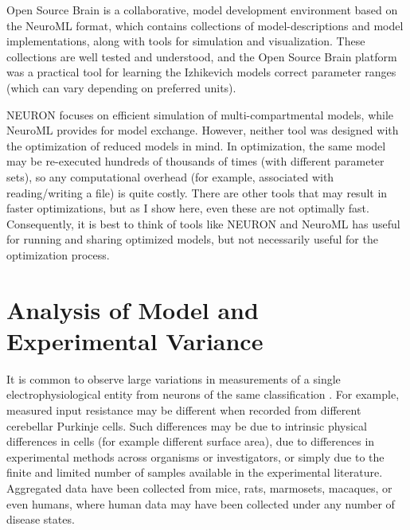 
Open Source Brain \citep{gleeson2019open} is a collaborative, model development environment based on the NeuroML format, which contains collections of model-descriptions and model implementations, along with tools for simulation and visualization.
These collections are well tested and understood, and the Open Source Brain platform was a practical tool for learning the Izhikevich models correct parameter ranges (which can vary depending on preferred units).

NEURON focuses on efficient simulation of multi-compartmental models, while NeuroML provides for model exchange. 
However, neither tool was designed with the optimization of reduced models in mind.
In optimization, the same model may be re-executed hundreds of thousands of times (with different parameter sets), so any computational overhead (for example, associated with reading/writing a file) is quite costly.  
There are other tools that may result in faster optimizations, but as I show here, even these are not optimally fast.
Consequently, it is best to think of tools like NEURON and NeuroML has useful for running and sharing optimized models, but not necessarily useful for the optimization process.  

\section{Analysis of Model and Experimental Variance}
It is common to observe large variations in measurements of a single electrophysiological entity from neurons of the same classification \citep{tripathy2014neuroelectro}.
For example, measured input resistance may be different when recorded from different cerebellar Purkinje cells.
Such differences may be due to intrinsic physical differences in cells (for example different surface area), due to differences in experimental methods across organisms or investigators, or simply due to the finite and limited number of samples available in the experimental literature.  
Aggregated data have been collected from mice, rats, marmosets, macaques, or even humans, where human data may have been collected under any number of disease states.

